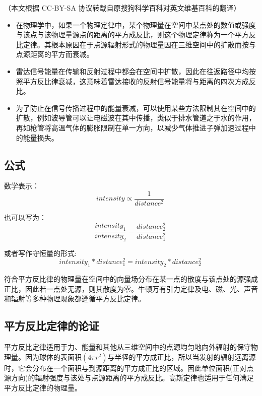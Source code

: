 
（本文根据 CC-BY-SA 协议转载自原搜狗科学百科对英文维基百科的翻译）

\begin{itemize}
\item 在物理学中，如果一个物理定律中，某个物理量在空间中某点处的数值或强度与该点与该物理量源点的距离的平方成反比，则这个物理定律称为一个平方反比定律。其根本原因在于点源辐射形式的物理量因在三维空间中的扩散而按与点源距离的平方而衰减。
\item 雷达信号能量在传输和反射过程中都会在空间中扩散，因此在往返路径中均按照平方反比律衰减，这意味着雷达接收的反射信号能量将与距离的四次方成反比。
\item 为了防止在信号传播过程中的能量衰减，可以使用某些方法限制其在空间中的扩散，例如波导管可以让电磁波在其中传播，类似于排水管道之于水的作用，再如枪管将高温气体的膨胀限制在单一方向，以减少气体推进子弹加速过程中的能量损失。
\end{itemize}
\subsection{公式}
数学表示：
\begin{equation}
intensity \propto \frac{1}{distance^2}~
\end{equation}

也可以写为：\begin{equation}
\frac{intensity_1}{intensity_2}=\frac{distance_2^2}{distance_1^2}~ 
\end{equation}

或者写作守恒量的形式:\begin{equation}
intensity_1 * distance_1^2 =intensity_2*distance_2^2~
\end{equation}

符合平方反比律的物理量在空间中的向量场分布在某一点的散度与该点处的源强成正比，因此若一点处无源，则其散度为零。牛顿万有引力定律及电、磁、光、声音和辐射等多种物理现象都遵循平方反比定律。
\subsection{ 平方反比定律的论证}
平方反比定律适用于力、能量和其他从三维空间中的点源均匀地向外辐射的保守物理量。因为球体的表面积$(4\pi r^2)$与半径的平方成正比，所以当发射的辐射远离源时，它会分布在一个面积与到源距离的平方成正比的区域。因此单位面积(正对点源方向)的辐射强度与该处与点源距离的平方成反比。高斯定律也适用于任何满足平方反比定律的物理量。

